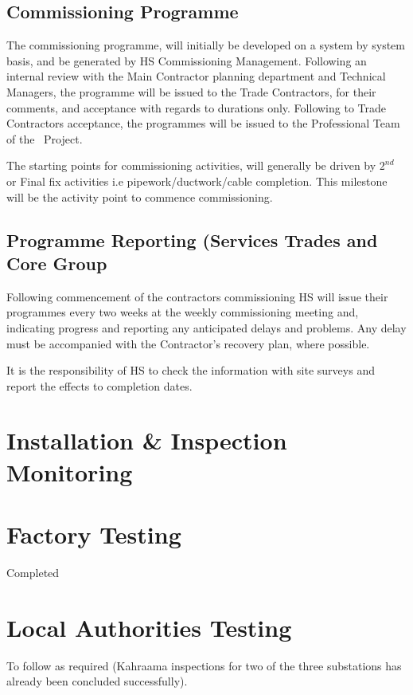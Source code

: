 \subsection{Commissioning Programme}

The commissioning programme, will initially be developed on a system by system basis, and be generated by HS Commissioning Management. Following an internal review with the Main Contractor planning department and Technical Managers, the programme will be issued to the Trade Contractors, for their comments, and acceptance with regards to durations only. Following to Trade Contractors acceptance, the programmes will be issued to the Professional Team of the \project\ Project.

The starting points for commissioning activities, will generally be driven by $2^{nd}$ or Final fix activities i.e pipework/ductwork/cable completion. This milestone will be the activity point to commence commissioning.

\subsection{Programme Reporting (Services Trades and Core Group}

Following commencement of the contractors commissioning HS will issue their programmes every two weeks at the weekly commissioning meeting and, indicating progress and reporting any anticipated delays and problems. Any delay must be accompanied with the Contractor's recovery plan, where possible.

It is the responsibility of HS to check the information with site surveys and report the effects to completion dates.

\section{Installation \& Inspection Monitoring}

\section{Factory Testing}
Completed

\section{Local Authorities Testing}
To follow as required (Kahraama inspections for two of the three substations has already been concluded successfully).

